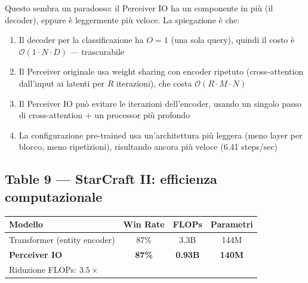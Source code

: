 \documentclass[12pt,a4paper]{article}
\begin{document}
\begin{notabox}
Questo sembra un paradosso: il Perceiver IO ha un componente in pi\`u (il decoder), eppure \`e leggermente pi\`u veloce. La spiegazione \`e che:
\begin{enumerate}
    \item Il decoder per la classificazione ha $O = 1$ (una sola query), quindi il costo \`e $\mathcal{O}(1 \cdot N \cdot D)$ --- trascurabile
    \item Il Perceiver originale usa weight sharing con encoder ripetuto (cross-attention dall'input ai latenti per $R$ iterazioni), che costa $\mathcal{O}(R \cdot M \cdot N)$
    \item Il Perceiver IO pu\`o evitare le iterazioni dell'encoder, usando un singolo passo di cross-attention + un processor pi\`u profondo
    \item La configurazione pre-trained usa un'architettura pi\`u leggera (meno layer per blocco, meno ripetizioni), risultando ancora pi\`u veloce (6.41 steps/sec)
\end{enumerate}
\end{notabox}

\subsection{Table 9 --- StarCraft II: efficienza computazionale}

\begin{center}
\begin{tabular}{lccc}
\toprule
\textbf{Modello} & \textbf{Win Rate} & \textbf{FLOPs} & \textbf{Parametri} \\
\midrule
Transformer (entity encoder) & 87\% & 3.3B & 144M \\
\textbf{Perceiver IO} & \textbf{87\%} & \textbf{0.93B} & \textbf{140M} \\
\midrule
\multicolumn{4}{l}{Riduzione FLOPs: $\mathbf{3.5\times}$} \\
\bottomrule
\end{tabular}
\end{center}
\end{document}
